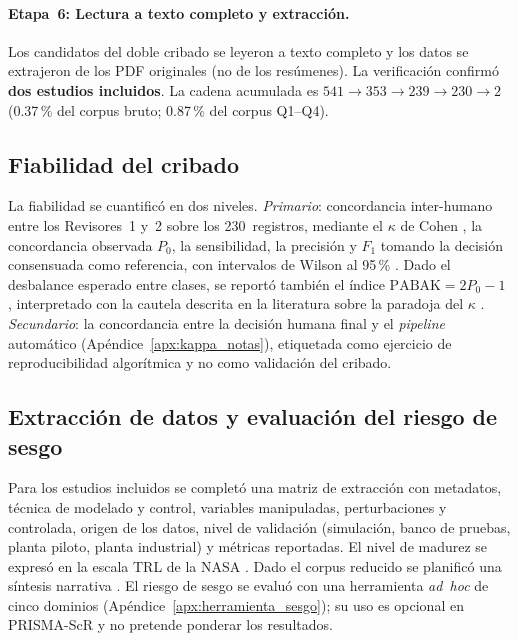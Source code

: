 \paragraph{Etapa~6: Lectura a texto completo y extracción.}
Los candidatos del doble cribado se leyeron a texto completo y los datos
se extrajeron de los PDF originales (no de los resúmenes). La verificación
confirmó \textbf{dos estudios incluidos}. La cadena acumulada es
$541 \rightarrow 353 \rightarrow 239 \rightarrow 230 \rightarrow 2$
(0.37\,\% del corpus bruto; 0.87\,\% del corpus Q1--Q4).

\subsection{Fiabilidad del cribado}
\label{sub:fiabilidad_metodos}

La fiabilidad se cuantificó en dos niveles. \emph{Primario}: concordancia
inter-humano entre los Revisores~1 y~2 sobre los 230~registros,
mediante el $\kappa$ de Cohen \parencite{mchugh2012interrater}, la
concordancia observada $P_0$, la sensibilidad, la precisión y $F_1$
tomando la decisión consensuada como referencia, con intervalos de Wilson
al 95\,\% \parencite{wilson1927probable}. Dado el desbalance esperado
entre clases, se reportó también el índice $\text{PABAK}=2P_0-1$
\parencite{byrt1993bias}, interpretado con la cautela descrita en la
literatura sobre la paradoja del $\kappa$ \parencite{feinstein1990high}.
\emph{Secundario}: la concordancia entre la decisión humana final y el
\textit{pipeline} automático (Apéndice~\ref{apx:kappa_notas}), etiquetada
como ejercicio de reproducibilidad algorítmica y no como validación del
cribado.

\subsection{Extracción de datos y evaluación del riesgo de sesgo}
\label{sub:extraccion}

Para los estudios incluidos se completó una matriz de extracción con
metadatos, técnica de modelado y control, variables manipuladas,
perturbaciones y controlada, origen de los datos, nivel de validación
(simulación, banco de pruebas, planta piloto, planta industrial) y
métricas reportadas. El nivel de madurez se expresó en la escala TRL de la
NASA \parencite{nasa2016trl}. Dado el corpus reducido se planificó una
síntesis narrativa \parencite{yaffe2012empty,lang2007empty}. El riesgo de
sesgo se evaluó con una herramienta \textit{ad~hoc} de cinco dominios
(Apéndice~\ref{apx:herramienta_sesgo}); su uso es opcional en
PRISMA-ScR y no pretende ponderar los resultados.

